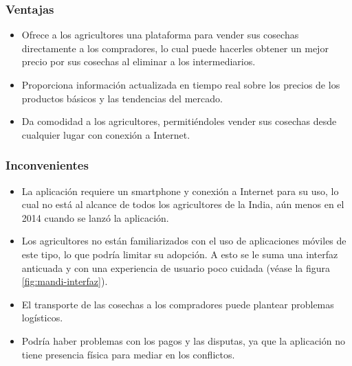 \subsubsection{Ventajas}

\begin{itemize}

	\item Ofrece a los agricultores una plataforma para vender sus cosechas directamente a los compradores, lo cual puede hacerles obtener un mejor precio por sus cosechas al eliminar a los intermediarios.

	\item Proporciona información actualizada en tiempo real sobre los precios de los productos básicos y las tendencias del mercado.

	\item  Da comodidad a los agricultores, permitiéndoles vender sus cosechas desde cualquier lugar con conexión a Internet.

\end{itemize}

\subsubsection{Inconvenientes}

\begin{itemize}

	\item La aplicación requiere un smartphone y conexión a Internet para su uso, lo cual no está al alcance de todos los agricultores de la India, aún menos en el 2014 cuando se lanzó la aplicación.

	\item Los agricultores no están familiarizados con el uso de aplicaciones móviles de este tipo, lo que podría limitar su adopción. A esto se le suma una interfaz anticuada y con una experiencia de usuario poco cuidada (véase la figura \ref{fig:mandi-interfaz}).

	\item El transporte de las cosechas a los compradores puede plantear problemas logísticos.

	\item Podría haber problemas con los pagos y las disputas, ya que la aplicación no tiene presencia física para mediar en los conflictos.

\end{itemize}

